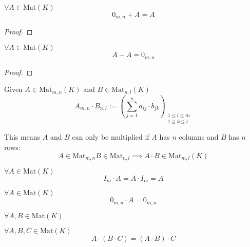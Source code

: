 \begin{proposition}[\(0_{m,n} + A\)]
   \(\forall A \in \text{Mat}(K)\)
   \[0_{m,n} + A = A\]
\end{proposition}
\begin{proof}
\end{proof}

\begin{proposition}[\(A - A\)]
   \(\forall A \in \text{Mat}(K)\)
   \[A - A = 0_{m,n}\]
\end{proposition}
\begin{proof}
\end{proof}

\begin{definition}\label{def:matrix_mult}
   Given \(A \in \text{Mat}_{m,n}(K)\) and \(B \in \text{Mat}_{n,l}(K)\)
   \[A_{m,n} \cdot B_{n,l} := \left(\sum_{j=1}^n a_{ij} \cdot b_{jk}\right)_{\substack{1 \leq i \leq m \\ 1 \leq k \leq l}}\]
\end{definition}
\begin{remark}
   This means \(A\) and \(B\) can only be multiplied if \(A\) has \(n\) columns and \(B\) has \(n\) rows:
   \[A \in \text{Mat}_{m,n} B \in \text{Mat}_{n,l} \implies A \cdot B \in \text{Mat}_{m,l}(K)\]
\end{remark}

\begin{proposition}[\(I_m \cdot A\)]
   \(\forall A \in \text{Mat}(K)\)
   \[I_m \cdot A = A \cdot I_m = A\]
\end{proposition}

\begin{proposition}[\(0_{m,n} \cdot A\)]
   \(\forall A \in \text{Mat}(K)\)
   \[0_{m,n} \cdot A = 0_{m,n}\]
\end{proposition}
\(\forall A, B \in \text{Mat}(K)\)

\begin{proposition}
   \(\forall A, B, C \in \text{Mat}(K)\)
   \[A \cdot (B \cdot C) = (A \cdot B) \cdot C\]
\end{proposition}

